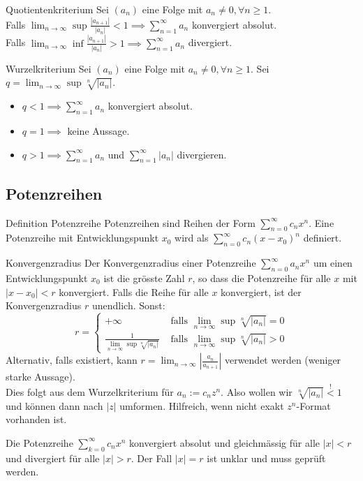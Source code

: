 \documentclass[a4paper,10pt]{article}
\def\limn{\lim_{n\to \infty}}
\def\sumn{\sum_{n=0}^\infty}
\begin{document}
\begin{mainbox}{Quotientenkriterium}
Sei $(a_n)$ eine Folge mit $a_n \ne 0, \forall n \ge 1$. \\ Falls $\limn \sup \frac{|a_{n+1}|}{|a_n|} < 1 \implies \sum_{n=1}^\infty a_n$ konvergiert absolut. \\Falls $\limn \inf \frac{|a_{n+1}|}{|a_n|} > 1 \implies \sum_{n=1}^\infty a_n$ divergiert.  
\end{mainbox}

\begin{mainbox}{Wurzelkriterium}
Sei $(a_n)$ eine Folge mit $a_n \ne 0, \forall n \ge 1$. Sei $q = \limn \sup \sqrt[n]{|a_n|}$. 
\begin{itemize}
 \item $q < 1 \implies \sum_{n=1}^\infty a_n$ konvergiert absolut.
 \item $q = 1 \implies$ keine Aussage.
 \item $q > 1 \implies \sum_{n=1}^\infty a_n$ und $\sum_{n=1}^\infty |a_n|$ divergieren.
\end{itemize}
\end{mainbox}


\subsection{Potenzreihen}
\begin{subbox}{Definition Potenzreihe}
 Potenzreihen sind Reihen der Form $\sum_{n=0}^\infty c_n x^n$. Eine Potenzreihe mit Entwicklungspunkt $x_0$ wird als $\sum_{n=0}^\infty c_n(x-x_0)^n$ definiert.
\end{subbox}

\begin{mainbox}{Konvergenzradius}
 Der Konvergenzradius einer Potenzreihe $\sumn a_n x^n$ um einen Entwicklungspunkt $x_0$ ist die grösste Zahl $r$, so dass die Potenzreihe für alle $x$ mit $|x - x_0| < r$ konvergiert. Falls die Reihe für alle $x$ konvergiert, ist der Konvergenzradius $r$ unendlich. Sonst:
 $$r = \begin{cases}
    +\infty & \text{ falls } \limn\sup \sqrt[n]{|a_n|} = 0\\
    \frac{1}{\limn\sup \sqrt[n]{|a_n|}} & \text{ falls }  \limn\sup \sqrt[n]{|a_n|} > 0
 \end{cases} $$
 Alternativ, falls existiert, kann $r = \limn \left| \frac{a_n}{a_{n+1}} \right|$ verwendet werden (weniger starke Aussage).\\
 Dies folgt aus dem Wurzelkriterium für $a_n := c_n z^n$. Also wollen wir $\sqrt[n]{|a_n|} \overset{!}{<} 1$ und können dann nach $|z|$ umformen. Hilfreich, wenn nicht exakt $z^n$-Format vorhanden ist.
\end{mainbox}
Die Potenzreihe $\sum_{k=0}^\infty c_n x^n$ konvergiert absolut und gleichmässig für alle $|x| < r$ und divergiert für alle $|x| > r$. Der Fall $|x| = r$ ist unklar und muss geprüft werden.
\end{document}
